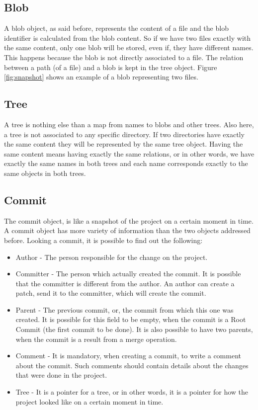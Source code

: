 \subsection{Blob}
A blob object, as said before, represents the content of a
file and the blob identifier is calculated from the blob content. So if we
have two files exactly with the same content, only one blob will be
stored, even if, they have different names. This happens because the
blob is not directly associated to a file. The relation between a path
(of a file) and a blob is kept in the tree object.  Figure \ref{fig:snapshot} 
shows an example of a blob representing two files.

\subsection{Tree}
A tree is nothing else than a map from names to blobs and other trees. Also here, a tree is not associated to any 
specific directory. If two directories have exactly the same content they will be
represented by the same tree object. Having the same content means
having exactly the same relations, or in other words, we
have exactly the same names in both trees and each name corresponds exactly
to the same objects in both trees. 

\subsection{Commit}
The commit object, is like a snapshot of the project on a certain moment in
time. A commit object has more variety of information than the two
objects addressed before. Looking a commit, it is possible to find out
the following:
\begin{itemize}
   \item Author - The person responsible for the change on the
   project.
   \item Committer - The person which actually created the commit. It
   is possible that the committer is different from the author. An
   author can create a patch, send it to the committer,
   which will create the commit.
   \item Parent - The previous commit, or, the commit from which this
   one was created. It is possible for this field to be empty, when 
   the commit is a Root Commit (the first commit to be done). 
   It is also possible to have two parents, when the commit is a result
   from a merge operation.
   \item Comment - It is mandatory, when creating a commit, to write a
   comment about the commit. Such comments should contain details about
   the changes that were done in the project.
   \item Tree - It is a pointer for a tree, or in other words, it is a pointer
   for how the project looked like on a certain moment in time. 
\end{itemize}


